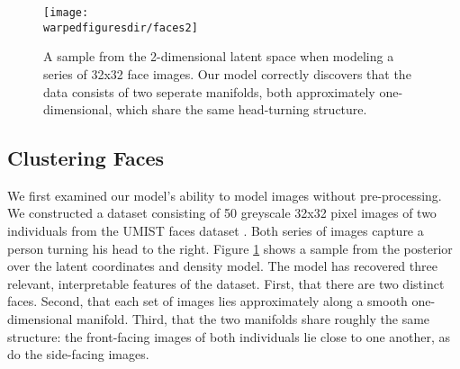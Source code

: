 \begin{figure}[t!]
\centering
\texttt{[image: \\warpedfiguresdir/faces2]}
\caption{A sample from the 2-dimensional latent space when modeling a series of 32x32 face images.  Our model correctly discovers that the data consists of two seperate manifolds, both approximately one-dimensional, which share the same head-turning structure.}
\label{fig:faces}
\end{figure}

\subsection{Clustering Faces}

We first examined our model's ability to model images without pre-processing.  We constructed a dataset consisting of 50 greyscale 32x32 pixel images of two individuals from the UMIST faces dataset \cite{umistfaces}.  Both series of images capture a person turning his head to the right.  Figure \ref{fig:faces} shows a sample from the posterior over the latent coordinates and density model.  The model has recovered three relevant, interpretable features of the dataset.  First, that there are two distinct faces.  Second, that each set of images lies approximately along a smooth one-dimensional manifold.  Third, that the two manifolds share roughly the same structure: the front-facing images of both individuals lie close to one another, as do the side-facing images.

